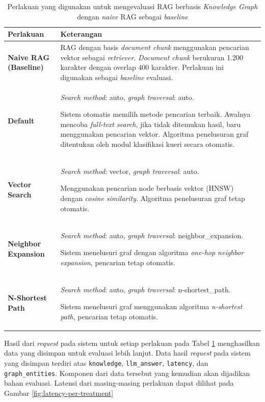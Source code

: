 \begin{table}[H]
	\centering
	\caption{Perlakuan yang digunakan untuk mengevaluasi RAG berbasis \textit{Knowledge Graph} dengan \textit{naive} RAG sebagai \textit{baseline}}
	\label{tab:evaluation-treatment}
	\begin{tabular}{|l|p{9cm}|}
		\hline
		\textbf{Perlakuan}            & \textbf{Keterangan}                                                    \\
		\hline \hline
		\textbf{Naive RAG (Baseline)} &
		RAG dengan basis \textit{document chunk} menggunakan pencarian vektor sebagai \textit{retriever}.
		\textit{Document chunk} berukuran 1.200 karakter dengan overlap 400 karakter.
		Perlakuan ini digunakan sebagai \textit{baseline} evaluasi.                                            \\
		\hline
		\textbf{Default}              &
		\textit{Search method}: auto, \textit{graph traversal}: auto.

		Sistem otomatis memilih metode pencarian terbaik.
		Awalnya mencoba \textit{full-text search}, jika tidak ditemukan hasil, baru menggunakan pencarian vektor.
		Algoritma penelusuran graf ditentukan oleh modul klasifikasi kueri secara otomatis.                    \\
		\hline
		\textbf{Vector Search}        &
		\textit{Search method}: vector, \textit{graph traversal}: auto.

		Menggunakan pencarian node berbasis vektor (HNSW) dengan \textit{cosine similarity}.
		Algoritma penelusuran graf tetap otomatis.                                                             \\
		\hline
		\textbf{Neighbor Expansion}   &
		\textit{Search method}: auto, \textit{graph traversal}: neighbor\_expansion.

		Sistem menelusuri graf dengan algoritma \textit{one-hop neighbor expansion}, pencarian tetap otomatis. \\
		\hline
		\textbf{N-Shortest Path}      &
		\textit{Search method}: auto, \textit{graph traversal}: n-shortest\_path.

		Sistem menelusuri graf menggunakan algoritma \textit{n-shortest path}, pencarian tetap otomatis.       \\
		\hline
	\end{tabular}
\end{table}

Hasil dari \textit{request} pada sistem untuk setiap perlakuan pada Tabel \ref{tab:evaluation-treatment} menghasilkan data yang disimpan untuk evaluasi lebih lanjut.
Data hasil \textit{request} pada sistem yang disimpan terdiri atas \texttt{knowledge}, \texttt{llm\_answer}, \texttt{latency}, dan \texttt{graph\_entities}.
Komponen dari data tersebut yang kemudian akan dijadikan bahan evaluasi.
Latensi dari masing-masing perlakuan dapat dilihat pada Gambar \ref{fig:latency-per-treatment}

